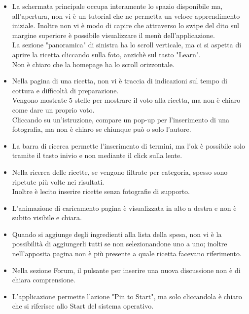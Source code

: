 \begin{itemize}
\item La schermata principale occupa interamente lo spazio disponibile ma, all'apertura, non vi è un tutorial che ne permetta un veloce apprendimento iniziale. Inoltre non vi è modo di capire che attraverso lo swipe del dito sul margine superiore è possibile visualizzare il menù dell'applicazione.\\La sezione "panoramica" di sinistra ha lo scroll verticale, ma ci si aspetta di aprire la ricetta cliccando sulla foto, anzichè sul tasto "Learn".\\Non è chiaro che la homepage ha lo scroll orizzontale.

\item Nella pagina di una ricetta, non vi è traccia di indicazioni sul tempo di cottura e difficoltà di preparazione.\\
Vengono mostrate 5 stelle per mostrare il voto alla ricetta, ma non è chiaro come dare un proprio voto.\\
Cliccando su un'istruzione, compare un pop-up per l'inserimento di una fotografia, ma non è chiaro se chiunque può o solo l'autore.\\

\item La barra di ricerca permette l'inserimento di termini, ma l'ok è possibile solo tramite il tasto inivio e non mediante il click sulla lente.

\item Nella ricerca delle ricette, se vengono filtrate per categoria, spesso sono ripetute più volte nei risultati.\\Inoltre è lecito inserire ricette senza fotografie di supporto.

\item L'animazione di caricamento pagina è visualizzata in alto a destra e non è subito visibile e chiara.

\item Quando si aggiunge degli ingredienti alla lista della spesa, non vi è la possibilità di aggiungerli tutti se non selezionandone uno a uno; inoltre nell'apposita pagina non è più presente a quale ricetta facevano riferimento.

\item Nella sezione Forum, il pulsante per inserire una nuova discussione non è di chiara comprensione.

\item L'applicazione permette l'azione "Pin to Start", ma solo cliccandola è chiaro che si riferisce allo Start del sistema operativo.

\end{itemize}

